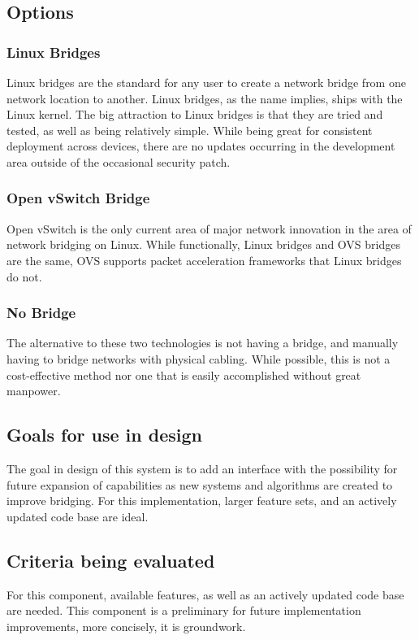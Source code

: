 \documentclass[10pt,letterpaper,onecolumn,draftclsnofoot]{IEEEtran}
\begin{document}
\subsection{Options}

\subsubsection{Linux Bridges}
Linux bridges are the standard for any user to create a network bridge from
one network location to another. Linux bridges, as the name implies, ships with
the Linux kernel. The big attraction to Linux bridges is that they are tried and
tested, as well as being relatively simple. While being great for consistent
deployment across devices, there are no updates occurring in the development
area outside of the occasional security patch.\cite{ovs-linuxbridge}

\subsubsection{Open vSwitch Bridge}
Open vSwitch is the only current area of major network innovation in the area of
network bridging on Linux. While functionally, Linux bridges and OVS bridges are
the same, OVS supports packet acceleration frameworks that Linux bridges do not.
\cite{ovs-linuxbridge}

\subsubsection{No Bridge}
The alternative to these two technologies is not having a bridge, and manually
having to bridge networks with physical cabling. While possible, this is not a
cost-effective method nor one that is easily accomplished without great
manpower.

\subsection{Goals for use in design}
The goal in design of this system is to add an interface with the possibility
for future expansion of capabilities as new systems and algorithms are created
to improve bridging. For this implementation, larger feature sets, and an
actively updated code base are ideal.

\subsection{Criteria being evaluated}
For this component, available features, as well as an actively updated code base
are needed. This component is a preliminary for future implementation
improvements, more concisely, it is groundwork.
\end{document}
